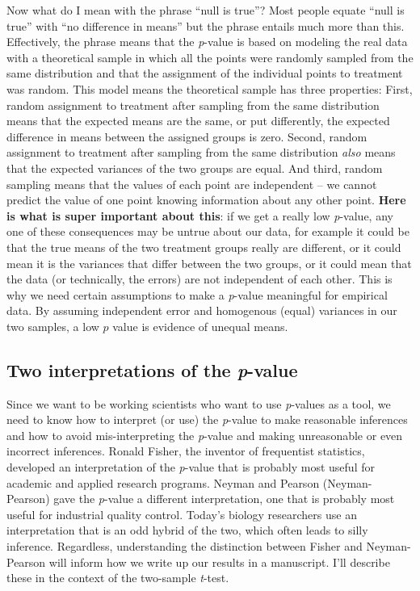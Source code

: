 \documentclass[]{book}
\begin{document}
Now what do I mean with the phrase ``null is true''? Most people equate
``null is true'' with ``no difference in means'' but the phrase entails
much more than this. Effectively, the phrase means that the
\emph{p}-value is based on modeling the real data with a theoretical
sample in which all the points were randomly sampled from the same
distribution and that the assignment of the individual points to
treatment was random. This model means the theoretical sample has three
properties: First, random assignment to treatment after sampling from
the same distribution means that the expected means are the same, or put
differently, the expected difference in means between the assigned
groups is zero. Second, random assignment to treatment after sampling
from the same distribution \emph{also} means that the expected variances
of the two groups are equal. And third, random sampling means that the
values of each point are independent -- we cannot predict the value of
one point knowing information about any other point. \textbf{Here is
what is super important about this}: if we get a really low
\emph{p}-value, any one of these consequences may be untrue about our
data, for example it could be that the true means of the two treatment
groups really are different, or it could mean it is the variances that
differ between the two groups, or it could mean that the data (or
technically, the errors) are not independent of each other. This is why
we need certain assumptions to make a \emph{p}-value meaningful for
empirical data. By assuming independent error and homogenous (equal)
variances in our two samples, a low \(p\) value is evidence of unequal
means.

\subsection{\texorpdfstring{Two interpretations of the
\emph{p}-value}{Two interpretations of the p-value}}\label{two-interpretations-of-the-p-value}

Since we want to be working scientists who want to use \emph{p}-values
as a tool, we need to know how to interpret (or use) the \emph{p}-value
to make reasonable inferences and how to avoid mis-interpreting the
\emph{p}-value and making unreasonable or even incorrect inferences.
Ronald Fisher, the inventor of frequentist statistics, developed an
interpretation of the \emph{p}-value that is probably most useful for
academic and applied research programs. Neyman and Pearson
(Neyman-Pearson) gave the \emph{p}-value a different interpretation, one
that is probably most useful for industrial quality control. Today's
biology researchers use an interpretation that is an odd hybrid of the
two, which often leads to silly inference. Regardless, understanding the
distinction between Fisher and Neyman-Pearson will inform how we write
up our results in a manuscript. I'll describe these in the context of
the two-sample \emph{t}-test.
\end{document}
